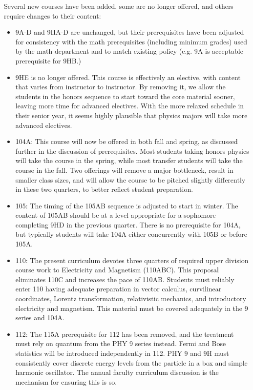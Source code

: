 \documentclass[12pt]{article}
\begin{document}
\vskip 2cm
Several new courses have been added, some are no longer offered, and
others require changes to their content:
\begin{itemize}

\item 9A-D and 9HA-D are unchanged, but their prerequisites have been
  adjusted for consistency with the math prerequisites (including
  minimum grades) used by the math department and to match existing
  policy (e.g. 9A is acceptable prerequisite for 9HB.)

\item 9HE is no longer offered.  This course is effectively an
  elective, with content that varies from instructor to instructor.
  By removing it, we allow the students in the honors sequence to
  start toward the core material sooner, leaving more time for
  advanced electives. With the more relaxed schedule in their senior
  year, it seems highly plausible that physics majors will take more
  advanced electives.

\item 104A: This course will now be offered in both fall and spring,
  as discussed further in the discussion of prerequisites.  Most
  students taking honors physics will take the course in the spring,
  while most transfer students will take the course in the fall.  Two
  offerings will remove a major bottleneck, result in smaller class sizes,
  and will allow the course to be pitched slightly differently in
  these two quarters, to better reflect student preparation.

\item 105: The timing of the 105AB sequence is adjusted to start in
  winter.  The content of 105AB should be at a level appropriate for a
  sophomore completing 9HD in the previous quarter.  There is no prerequisite for
  104A, but typically students will take 104A either concurrently with
  105B or before 105A.

\item 110: The present curriculum devotes three quarters of required
  upper division course work to Electricity and Magnetism (110ABC).
  This proposal eliminates 110C and increases the pace of 110AB.
  Students must reliably enter 110 having adequate preparation in
  vector calculus, curvilinear coordinates, Lorentz transformation,
  relativistic mechanics, and introductory electricity and magnetism.
  This material must be covered adequately in the 9 series and 104A.

\item 112: The 115A prerequisite for 112 has been removed, and the
  treatment must rely on quantum from the PHY 9 series instead.  Fermi
  and Bose statistics will be introduced independently in 112.  PHY 9
  and 9H must consistently cover discrete energy levels from the
  particle in a box and simple harmonic oscillator.  The annual
  faculty curriculum discussion is the mechanism for ensuring this is
  so.
    

\end{itemize}
\end{document}
